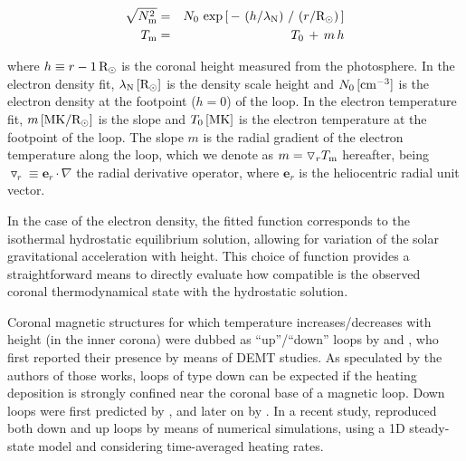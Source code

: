 \documentclass[namedreferences]{solarphysics}
\renewcommand{\l}{\lambda_{\rm N}}%
\newcommand{\mrsun}{{\rm R_\odot}}
\newcommand{\MK}{{\rm MK}}
\newcommand{\cm}{{\rm cm}}
\newcommand{\cminvc}{\cm^{-3}}
\newcommand{\dr}{\triangledown_r}
\newcommand{\er}{\mathbf{e}_r}
\newcommand{\Tm}{T_{\rm m}}
\newcommand{\Nsqm}{N^2_{{\rm m}}}
\newcommand{\sqravgN}{\sqrt{\Nsqm}}
\begin{document}
\begin{article}
\begin{eqnarray}\label{Nfit}
\sqravgN &=& N_0\,\exp{\left[\,-\,\left(h/\l\right)\,/\,\left(r/\mrsun\right)\,\right]}\\
\label{Tfit}
\Tm &=& T_0\,+\,m\,h
\end{eqnarray}

\noindent
where $h \equiv r - 1\,\mrsun$ is the coronal height measured from the photosphere. In the electron density fit, $\l\,[\mrsun]$ is the density scale height and $N_0\,[\cminvc]$ is the electron density at the footpoint ($h=0$) of the loop. In the electron temperature fit, $m\,[\MK/\mrsun]$ is the slope and $T_0\,[\MK]$ is the electron temperature at the footpoint of the loop. The slope $m$ is the radial gradient of the electron temperature along the loop, which we denote as $m = \dr\Tm$ hereafter, being $\dr\equiv\er\cdot\nabla$ the radial derivative operator, where $\er$ is the heliocentric radial unit vector.

In the case of the electron density, the fitted function corresponds to the isothermal hydrostatic equilibrium solution, allowing for variation of the solar gravitational acceleration with height. This choice of function provides a straightforward means to directly evaluate how compatible is the observed coronal thermodynamical state with the hydrostatic solution.

{Coronal magnetic structures for which temperature increases/decreases with height (in the inner corona) were dubbed as “up”/“down” loops by \citet{huang_2012} and \citet{nuevo_2013}, who first reported their presence by means of DEMT studies. As speculated by the authors of those works, loops of type down can be expected if the heating deposition is strongly confined near the coronal base of a magnetic loop. Down loops were first predicted by \citet{serio_1981}, and later on by \citet{aschwanden_2002}. In a recent study, \citet{schiff_2016} reproduced both down and up loops by means of numerical simulations, using a 1D steady-state model and {considering time-averaged heating rates.}}


\end{article}
\end{document}
